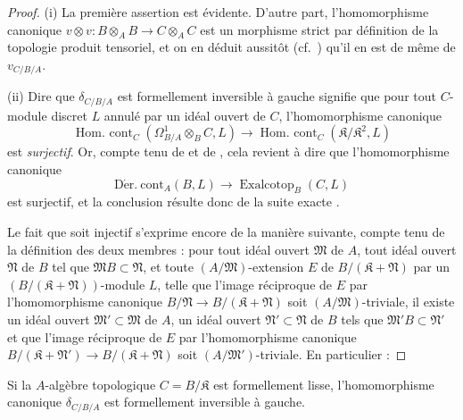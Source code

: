 \begin{proof}
(i) La première assertion est évidente. D'autre part, l'homomorphisme
canonique $v\otimes v:B\otimes_A B\to C\otimes_A C$ est un morphisme strict
par définition de la topologie produit tensoriel, et on en déduit aussitôt
(cf.\ ) qu'il en est de même de $v_{C/B/A}$.

(ii) Dire que $\delta_{C/B/A}$ est formellement inversible à gauche signifie
que pour tout $C$-module discret $L$ annulé par un idéal ouvert de $C$,
l'homomorphisme canonique
\[
  \operatorname{Hom.\ cont}_C(\Omega^1_{B/A}\otimes_B C,L)\to
  \operatorname{Hom.\ cont}_C(\mathfrak{K}/\mathfrak{K}^2,L)
\]
est \emph{surjectif}. Or, compte tenu de  et de
, cela revient à dire que l'homomorphisme canonique
\[
  \operatorname{D\acute{e}r.\ cont}_A(B,L)\to
  \operatorname{Exalcotop}_B(C,L)
\]
est surjectif, et la conclusion résulte donc de la suite exacte
.

Le fait que  soit injectif s'exprime encore de la manière
suivante, compte tenu de la définition des deux membres
 : pour tout idéal ouvert $\mathfrak{M}$ de $A$, tout idéal
ouvert $\mathfrak{N}$ de $B$ tel que $\mathfrak{M}B\subset\mathfrak{N}$, et
toute $(A/\mathfrak{M})$-extension $E$ de
$B/(\mathfrak{K}+\mathfrak{N})$ par un
$(B/(\mathfrak{K}+\mathfrak{N}))$-module $L$, telle que l'image réciproque de
$E$ par l'homomorphisme canonique
$B/\mathfrak{N}\to B/(\mathfrak{K}+\mathfrak{N})$ soit
$(A/\mathfrak{M})$-triviale, il existe un idéal ouvert
$\mathfrak{M}'\subset\mathfrak{M}$ de $A$,
un idéal ouvert $\mathfrak{N}'\subset\mathfrak{N}$ de $B$ tels que
$\mathfrak{M}'B\subset\mathfrak{N}'$ et que l'image réciproque de $E$ par
l'homomorphisme canonique
$B/(\mathfrak{K}+\mathfrak{N}')\to B/(\mathfrak{K}+\mathfrak{N})$ soit
$(A/\mathfrak{M}')$-triviale. En particulier :
\end{proof}

\begin{corollary}[20.7.9]
\label{0.20.7.9-fr}
Si la $A$-algèbre topologique $C=B/\mathfrak{K}$ est formellement lisse,
l'homomorphisme canonique $\delta_{C/B/A}$ est formellement inversible à
gauche.
\end{corollary}

